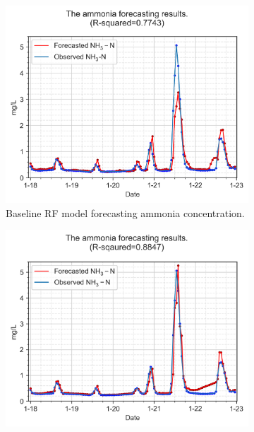 \begin{figure}[h]
    \centering
    \hspace{1em}%
    \begin{subfigure}[t]{0.45\textwidth}
      \includegraphics[width=\linewidth]{imgs/results/ammonia-colour-forecast-plot/00-RF_1_pred_Step1-obs-nh3.png}
      \caption{Baseline RF model forecasting ammonia concentration.} \label{fig:baseline-nh3-plot-rf}
    \end{subfigure}%
    \hspace{1em}%
    \begin{subfigure}[t]{0.45\textwidth}
      \includegraphics[width=\linewidth]{imgs/results/ammonia-colour-forecast-plot/00-LSTM_1_pred_Step1-obs-nh3.png}

\end{subfigure}
\end{figure}
